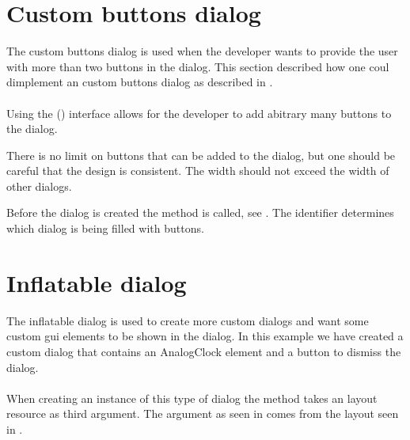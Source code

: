 

\section{Custom buttons dialog}
\label{sec:impl_custom_buttons}

The custom buttons dialog is used when the developer wants to provide the user with more than two buttons in the dialog. This section described how one coul dimplement an custom buttons dialog as described in .
\\\\
Using the  () interface allows for the developer to add abitrary many buttons to the dialog.

\begin{note}
    There is no limit on buttons that can be added to the dialog, but one should be careful that the design is consistent. The width should not exceed the width of other dialogs.
\end{note}



\noindent
Before the dialog is created the  method is called, see . The identifier  determines which dialog is being filled with buttons.

\section{Inflatable dialog}
\label{sec:impl_inflatable_dialog}

The inflatable dialog is used to create more custom dialogs and want some custom gui elements to be shown in the dialog. In this example we have created a custom dialog that contains an AnalogClock element and a button to dismiss the dialog.
\\\\
When creating an instance of this type of dialog the  method takes an layout resource as third argument. The argument  as seen in  comes from the layout seen in .

